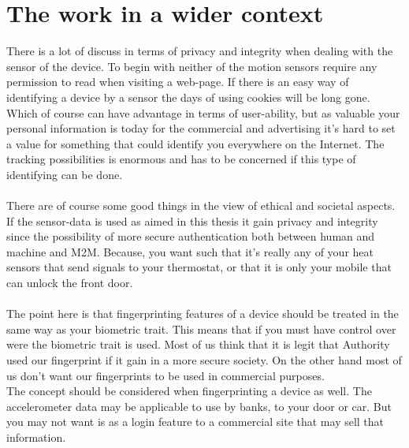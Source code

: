 \section{The work in a wider context}\label{sec:ethical}
There is a lot of discuss in terms of privacy and integrity when dealing with the sensor of the device. To begin with neither of the motion sensors require any permission to read when visiting a web-page. If there is an easy way of identifying a device by a sensor the days of using cookies will be long gone. Which of course can have advantage in terms of user-ability, but as valuable your personal information is today for the commercial and advertising it’s hard to set a value for something that could identify you everywhere on the Internet. The tracking possibilities is enormous and has to be concerned if this type of identifying can be done. \\
\\
There are of course some good things in the view of ethical and societal aspects. If the sensor-data is used as aimed in this thesis it gain privacy and integrity since the possibility of more secure authentication both between human and machine and M2M. Because, you want such that it's really any of your heat sensors that send signals to your thermostat, or that it is only your mobile that can unlock the front door.\\
\\
The point here is that fingerprinting features of a device should be treated in the same way as your biometric trait. This means that if you must have control over were the biometric trait is used. Most of us think that it is legit that Authority used our fingerprint if it gain in a more secure society. On the other hand most of us don't want our fingerprints to be used in commercial purposes. \\
The concept should be considered when fingerprinting a device as well. The accelerometer data may be applicable to use by banks, to your door or car. But you may not want is as a login feature to a commercial site that may sell that information.